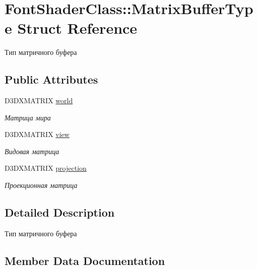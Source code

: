 \hypertarget{struct_font_shader_class_1_1_matrix_buffer_type}{}\section{Font\+Shader\+Class\+:\+:Matrix\+Buffer\+Type Struct Reference}
\label{struct_font_shader_class_1_1_matrix_buffer_type}


Тип матричного буфера  


\subsection*{Public Attributes}
\begin{DoxyCompactItemize}
\item 
D3\+D\+X\+M\+A\+T\+R\+IX \hyperlink{struct_font_shader_class_1_1_matrix_buffer_type_ad4d1a71cc93255488965716de818df54}{world}
\begin{DoxyCompactList}\small\item\em Матрица мира \end{DoxyCompactList}\item 
D3\+D\+X\+M\+A\+T\+R\+IX \hyperlink{struct_font_shader_class_1_1_matrix_buffer_type_a01a623f0449310af5ddf9746a088cde3}{view}
\begin{DoxyCompactList}\small\item\em Видовая матрица \end{DoxyCompactList}\item 
D3\+D\+X\+M\+A\+T\+R\+IX \hyperlink{struct_font_shader_class_1_1_matrix_buffer_type_a91386d51b3a32c8c5b45c0e918dc912b}{projection}
\begin{DoxyCompactList}\small\item\em Проекционная матрица \end{DoxyCompactList}\end{DoxyCompactItemize}


\subsection{Detailed Description}
Тип матричного буфера 

\subsection{Member Data Documentation}
\mbox{\label{struct_font_shader_class_1_1_matrix_buffer_type_a91386d51b3a32c8c5b45c0e918dc912b}} 
